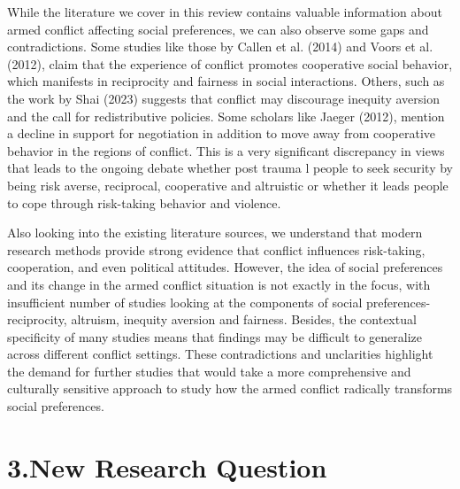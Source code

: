 \documentclass[14pt]{article}
\theoremstyle{remark}
\begin{document}
While the literature we cover in this review contains valuable information about armed conflict affecting social preferences, we can also observe some gaps and contradictions. Some studies like those by Callen et al. (2014) and Voors et al. (2012), claim that the experience of conflict promotes cooperative social behavior, which manifests in reciprocity and fairness in social interactions. Others, such as the work by Shai (2023) suggests that conflict may discourage inequity aversion and the call for redistributive policies. Some scholars like Jaeger (2012), mention a decline in support for negotiation in addition to move away from cooperative behavior in the regions of conflict. This is a very significant discrepancy in views that leads to the ongoing debate whether post trauma l people to seek security by being risk averse, reciprocal, cooperative and altruistic or whether it leads people to cope through risk-taking behavior and violence.

Also looking into the existing literature sources, we understand that modern research methods provide strong evidence that conflict influences risk-taking, cooperation, and even political attitudes. However, the idea of social preferences and its change in the armed conflict situation is not exactly in the focus, with insufficient number of studies looking at the components of social preferences- reciprocity, altruism, inequity aversion and fairness. Besides, the contextual specificity of many studies means that findings may be difficult to generalize across different conflict settings. These contradictions and unclarities highlight the demand for further studies that would take a more comprehensive and culturally sensitive approach to study how the armed conflict radically transforms social preferences.

\section{3.New Research Question}
\end{document}
